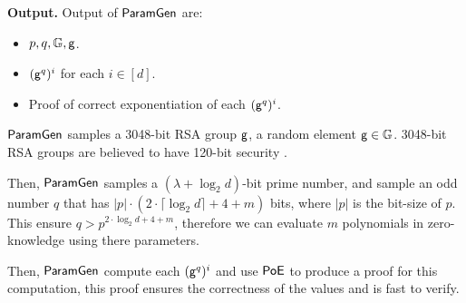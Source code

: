 \textbf{Output.} Output of $\mathsf{ParamGen}$ are:
\begin{itemize}
    \item $p, q, \mathbb{G}, \mathsf{g}$.
    \item $(\mathsf{g}^q)^i$ for each $i \in [d]$.
    \item Proof of correct exponentiation of each $(\mathsf{g}^q)^i$.
\end{itemize}

$\mathsf{ParamGen}$ samples a 3048-bit RSA group $\mathsf{g}$, a random element $\mathsf{g} \in \mathbb{G}$. 3048-bit RSA groups are believed to have 120-bit security \cite{bunz2020transparent}.

Then, $\mathsf{ParamGen}$ samples a $(\lambda + \log_2 d)$-bit prime number, and sample an odd number $q$ that has $|p| \cdot (2 \cdot \lceil \log_2 d \rceil + 4 + m)$ bits, where $|p|$ is the bit-size of $p$. This ensure $q > p^{2 \cdot \log_2 d + 4 + m}$, therefore we can evaluate $m$ polynomials in zero-knowledge using there parameters.

Then, $\mathsf{ParamGen}$ compute each $(\mathsf{g}^q)^i$ and use $\mathsf{PoE}$ to produce a proof for this computation, this proof ensures the correctness of the values and is fast to verify.